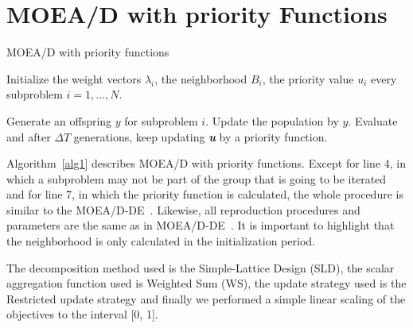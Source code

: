 \section{MOEA/D with priority Functions}



\begin{algorithm}[h]
	\caption{MOEA/D with priority functions}\label{alg1}
	\begin{algorithmic}[1]
		
		\State Initialize the weight vectors $\lambda_i$, the neighborhood $B_i$, the priority value $u_i$ every subproblem $i=1,...,N$.
		
		\State Generate an offspring $y$ for subproblem $i$.
		\State Update the population by $y$.
		\EndIf
		\EndFor
		\State  Evaluate and after $\Delta T$ generations, keep updating \textit{\textbf{u}} by a priority function.
		\EndWhile
	\end{algorithmic}
\end{algorithm}




Algorithm~\ref{alg1} describes MOEA/D with priority functions. Except for line 4, in which a subproblem may not be part of the group that is going to be iterated and for line 7, in which the priority function is calculated, the whole procedure is similar to the MOEA/D-DE~\cite{zhang2009performance}. Likewise, all reproduction procedures and parameters are the same as in MOEA/D-DE~\cite{li2009multiobjective}. It is important to highlight that the neighborhood is only calculated in the initialization period.

The decomposition method used is the Simple-Lattice Design (SLD), the scalar aggregation function used is Weighted Sum (WS), the update strategy used is the Restricted update strategy and finally we performed a simple linear scaling of the objectives to the interval [0, 1].



